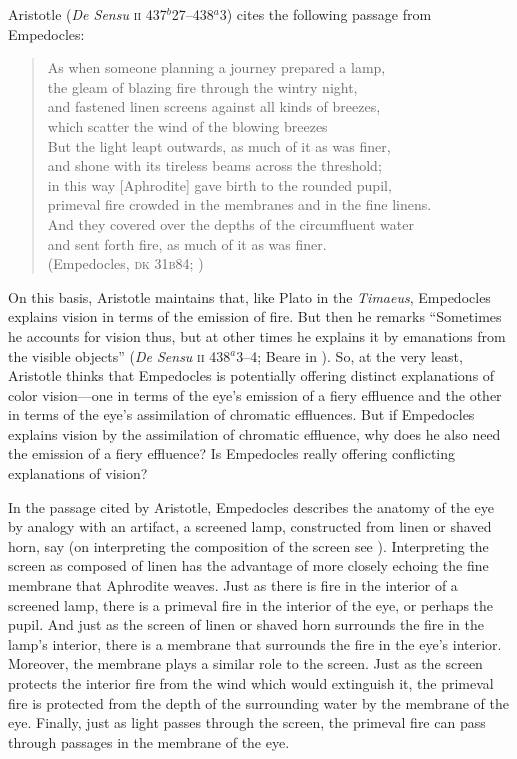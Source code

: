 Aristotle (\emph{De Sensu} \textsc{ii} 437\( ^{b} \)27--438\( ^{a} \)3) cites the following passage from Empedocles:
\begin{verse}
	As when someone planning a journey prepared a lamp,\\
	the gleam of blazing fire through the wintry night,\\
	and fastened linen screens against all kinds of breezes,\\
	which scatter the wind of the blowing breezes\\
	But the light leapt outwards, as much of it as was finer,\\
	and shone with its tireless beams across the threshold;\\
	in this way [Aphrodite] gave birth to the rounded pupil,\\
	primeval fire crowded in the membranes and in the fine linens.\\
	And they covered over the depths of the circumfluent water\\
	and sent forth fire, as much of it as was finer.\\
	(Empedocles, \textsc{dk} 31\textsc{b}84; \citealt[103 259]{Inwood:2001ve})
\end{verse}
On this basis, Aristotle maintains that, like Plato in the \emph{Timaeus}, Empedocles explains vision in terms of the emission of fire. But then he remarks ``Sometimes he accounts for vision thus, but at other times he explains it by emanations from the visible objects'' (\emph{De Sensu} \textsc{ii} 438\( ^{a} \)3--4; Beare in \citealt[5]{Barnes:1984uq}). So, at the very least, Aristotle thinks that Empedocles is potentially offering distinct explanations of color vision---one in terms of the eye's emission of a fiery effluence and the other in terms of the eye's assimilation of chromatic effluences. But if Empedocles explains vision by the assimilation of chromatic effluence, why does he also need the emission of a fiery effluence? Is Empedocles really offering conflicting explanations of vision? 

In the passage cited by Aristotle, Empedocles describes the anatomy of the eye by analogy with an artifact, a screened lamp, constructed from linen or shaved horn, say (on interpreting the composition of the screen see \citealt[240--241]{Wright:1981zr}). Interpreting the screen as composed of linen has the advantage of more closely echoing the fine membrane that Aphrodite weaves. Just as there is fire in the interior of a screened lamp, there is a primeval fire in the interior of the eye, or perhaps the pupil. And just as the screen of linen or shaved horn surrounds the fire in the lamp's interior, there is a membrane that surrounds the fire in the eye's interior. Moreover, the membrane plays a similar role to the screen. Just as the screen protects the interior fire from the wind which would extinguish it, the primeval fire is protected from the depth of the surrounding water by the membrane of the eye. Finally, just as light passes through the screen, the primeval fire can pass through passages in the membrane of the eye. 

